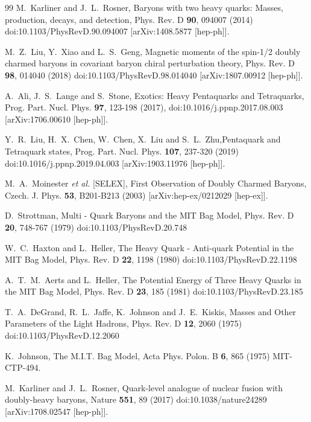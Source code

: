 \documentclass[prt,twocolumn,floatfix,nofootinbib]{revtex4}
\begin{document}
\begin{thebibliography}{99}
    M.~Karliner and J.~L.~Rosner, Baryons with two heavy quarks: Masses, production, decays, and detection, Phys. Rev. D \textbf{90}, 094007 (2014) doi:10.1103/PhysRevD.90.094007 [arXiv:1408.5877 [hep-ph]].

    M.~Z.~Liu, Y.~Xiao and L.~S.~Geng, Magnetic moments of the spin-1/2 doubly charmed baryons in covariant baryon chiral perturbation theory, Phys. Rev. D \textbf{98}, 014040 (2018) doi:10.1103/PhysRevD.98.014040  [arXiv:1807.00912 [hep-ph]].

    A.~Ali, J.~S.~Lange and S.~Stone, Exotics: Heavy Pentaquarks and Tetraquarks,
    Prog. Part. Nucl. Phys. \textbf{97}, 123-198 (2017), doi:10.1016/j.ppnp.2017.08.003 [arXiv:1706.00610 [hep-ph]].

    Y.~R.~Liu, H.~X.~Chen, W.~Chen, X.~Liu and S.~L.~Zhu,Pentaquark and Tetraquark states, Prog. Part. Nucl. Phys. \textbf{107}, 237-320 (2019)
    doi:10.1016/j.ppnp.2019.04.003  [arXiv:1903.11976 [hep-ph]].

    M.~A.~Moinester \textit{et al.} [SELEX], First Observation of Doubly Charmed Baryons, Czech. J. Phys. \textbf{53}, B201-B213 (2003) [arXiv:hep-ex/0212029 [hep-ex]].

    D.~Strottman, Multi - Quark Baryons and the MIT Bag Model, Phys. Rev. D \textbf{20}, 748-767 (1979) doi:10.1103/PhysRevD.20.748

    W.~C.~Haxton and L.~Heller, The Heavy Quark - Anti-quark Potential in the {MIT} Bag Model, Phys. Rev. D \textbf{22}, 1198 (1980)   doi:10.1103/PhysRevD.22.1198

    A.~T.~M.~Aerts and L.~Heller, The Potential Energy of Three Heavy Quarks in the {MIT} Bag Model, Phys. Rev. D \textbf{23}, 185 (1981)
    doi:10.1103/PhysRevD.23.185

    T.~A.~DeGrand, R.~L.~Jaffe, K.~Johnson and J.~E.~Kiskis, Masses and Other Parameters of the Light Hadrons, Phys. Rev. D \textbf{12}, 2060 (1975)
    doi:10.1103/PhysRevD.12.2060

    K.~Johnson, The M.I.T. Bag Model, Acta Phys. Polon. B \textbf{6}, 865 (1975)
    MIT-CTP-494.

    M.~Karliner and J.~L.~Rosner, Quark-level analogue of nuclear fusion with doubly-heavy baryons,  Nature \textbf{551}, 89 (2017)
    doi:10.1038/nature24289 [arXiv:1708.02547 [hep-ph]].


\end{thebibliography}
\end{document}
